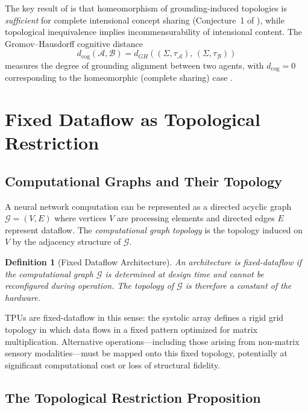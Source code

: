 \documentclass[12pt]{article}
\newtheorem{definition}{Definition}
\begin{document}
The key result of \cite{minamoto2026topology} is that homeomorphism of
grounding-induced topologies is \emph{sufficient} for complete intensional
concept sharing (Conjecture~1 of \cite{minamoto2026topology}), while topological
inequivalence implies incommensurability of intensional content. The
Gromov--Hausdorff cognitive distance
\[
d_{\mathrm{cog}}(\mathcal{A}, \mathcal{B})
= d_{GH}\!\left((\Sigma, \tau_{\mathcal{A}}),\, (\Sigma, \tau_{\mathcal{B}})\right)
\]
measures the degree of grounding alignment between two agents, with
$d_{\mathrm{cog}} = 0$ corresponding to the homeomorphic (complete sharing)
case \cite{gromov1981}.

\section{Fixed Dataflow as Topological Restriction}

\subsection{Computational Graphs and Their Topology}

A neural network computation can be represented as a directed acyclic graph
$\mathcal{G} = (V, E)$ where vertices $V$ are processing elements and
directed edges $E$ represent dataflow. The \emph{computational graph
topology} is the topology induced on $V$ by the adjacency structure of
$\mathcal{G}$.

\begin{definition}[Fixed Dataflow Architecture]
An architecture is \emph{fixed-dataflow} if the computational graph
$\mathcal{G}$ is determined at design time and cannot be reconfigured
during operation. The topology of $\mathcal{G}$ is therefore a constant
of the hardware.
\end{definition}

TPUs are fixed-dataflow in this sense: the systolic array defines a rigid
grid topology in which data flows in a fixed pattern optimized for
matrix multiplication. Alternative operations---including those arising
from non-matrix sensory modalities---must be mapped onto this fixed
topology, potentially at significant computational cost or loss of
structural fidelity.

\subsection{The Topological Restriction Proposition}
\end{document}
